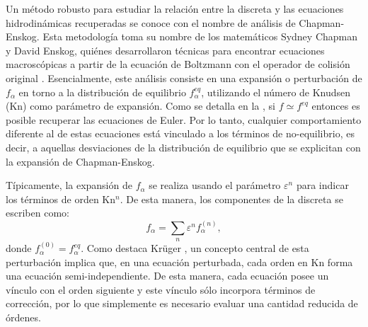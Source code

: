 Un m\'etodo robusto para estudiar la relaci\'on entre la \lbe{} discreta y las ecuaciones hidrodin\'amicas recuperadas se conoce con el nombre de an\'alisis de Chapman-Enskog. Esta metodolog\'ia toma su nombre de los matem\'aticos Sydney Chapman y David Enskog, qui\'enes desarrollaron t\'ecnicas para encontrar ecuaciones macrosc\'opicas a partir de la ecuaci\'on de Boltzmann con el operador de colisi\'on original \cite{chapman_mathematical_1970}. Esencialmente, este an\'alisis consiste en una expansi\'on o perturbaci\'on de $f_{\alpha}$ en torno a la distribuci\'on de equilibrio $f_{\alpha}^{eq}$, utilizando el n\'umero de Knudsen (Kn) como par\'ametro de expansi\'on. Como se detalla en la , si $f \simeq f^{eq}$ entonces es posible recuperar las ecuaciones de Euler. Por lo tanto, cualquier comportamiento diferente al de estas ecuaciones est\'a vinculado a los t\'erminos de no-equilibrio, es decir, a aquellas desviaciones de la distribuci\'on de equilibrio que se explicitan con la expansi\'on de Chapman-Enskog.

T\'ipicamente, la expansi\'on de $f_{\alpha}$ se realiza usando el par\'ametro $\varepsilon^n$ para indicar los t\'erminos de orden Kn$^n$. De esta manera, los componentes de la \fdp{} discreta se escriben como:
\begin{equation}
	f_{\alpha} = \sum_{n} \varepsilon^{n} f_{\alpha}^{(n)},
	\label{eq:f_che_gral}
\end{equation}
donde $f_{\alpha}^{(0)} = f_{\alpha}^{eq}$. Como destaca Kr\"uger \cite{kruger_lattice_2017}, un concepto central de esta perturbaci\'on implica que, en una ecuaci\'on perturbada, cada orden en Kn forma una ecuaci\'on semi-independiente. De esta manera, cada ecuaci\'on posee un v\'inculo con el orden siguiente y este v\'inculo s\'olo incorpora t\'erminos de correcci\'on, por lo que simplemente es necesario evaluar una cantidad reducida de \'ordenes. 

